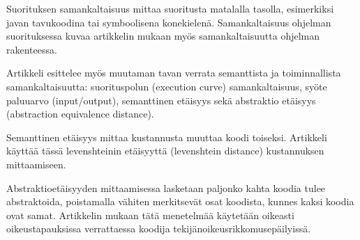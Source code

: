 \documentclass[finnish]{../tktltiki2}
\theoremstyle{definition}
\theoremstyle{remark}
\begin{document}
\begin{itemize}
Suorituksen samankaltaisuus mittaa suoritusta matalalla tasolla, esimerkiksi javan tavukoodina tai symboolisena konekielenä. Samankaltaisuus ohjelman suorituksessa kuvaa artikkelin mukaan myös samankaltaisuutta ohjelman rakenteessa.

Artikkeli esittelee myös muutaman tavan verrata semanttista ja toiminnallista samankaltaisuutta: suorituspolun (execution curve) samankaltaisuus, syöte paluuarvo (input/output), semanttinen etäisyys sekä abstraktio etäisyys (abstraction equivalence distance).

Semanttinen etäisyys mittaa kustannusta muuttaa koodi toiseksi. Artikkeli käyttää tässä levenshteinin etäisyyttä (levenshtein distance) kustannuksen mittaamiseen.

Abstraktioetäisyyden mittaamisessa lasketaan paljonko kahta koodia tulee abstraktoida, poistamalla vähiten merkitsevät osat koodista, kunnes kaksi koodia ovat samat. Artikkelin mukaan tätä menetelmää käytetään oikeasti oikeustapauksissa verrattaessa koodija tekijänoikeusrikkomusepäilyissä.
\end{itemize}




\end{document}
